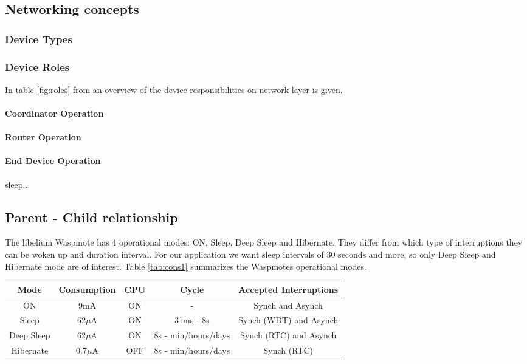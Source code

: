 \subsection{Networking concepts}
\subsubsection{Device Types}
\subsubsection{Device Roles}
In table \ref{fig:roles} from  an overview of the device responsibilities on network layer is given. 
\paragraph{Coordinator Operation}
\paragraph{Router Operation}
\paragraph{End Device Operation}
sleep...
\subsection{Parent - Child relationship}


The libelium Waspmote has 4 operational modes: ON, Sleep, Deep Sleep and Hibernate. They differ from which type of interruptions they can be woken up and duration interval. For our application we want sleep intervals of 30 seconds and more, so only Deep Sleep and Hibernate mode are of interest. Table \ref{tab:cons1} summarizes the Waspmotes operational modes.
\begin{table*}[!ht]
\begin{center}
\begin{tabular}[!ht]{|c|c|c|c|c|}
\hline
\textbf{Mode} & \textbf{Consumption} & \textbf{CPU} & \textbf{Cycle} & \textbf{Accepted Interruptions}\\
\hline
ON & 9mA & ON & - & Synch and Asynch\\
\hline
Sleep & 62$\mu$A  & ON & 31ms - 8s & Synch (WDT) and Asynch\\
\hline
Deep Sleep & 62$\mu$A & ON & 8s - min/hours/days & Synch (RTC) and Asynch\\
\hline
Hibernate & 0.7$\mu$A & OFF & 8s - min/hours/days & Synch (RTC)\\
\hline
\end{tabular}
\caption{Operational modes of Libelium Waspmote V1.1}
\label{tab:cons1}
\end{center}
\end{table*}

